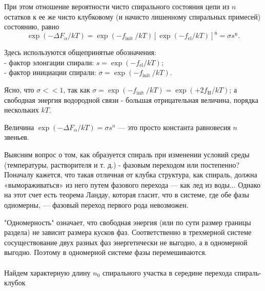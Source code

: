 \documentclass[
11pt,%
tightenlines,%
twoside,%
onecolumn,%
nofloats,%
nobibnotes,%
nofootinbib,%
superscriptaddress,%
noshowpacs,%
centertags]%
{revtex4}
\begin{document}
При этом отношение вероятности чисто спирального состояния цепи из $n$ остатков к ее же чисто клубковому (и начисто лишенному спиральных примесей) состоянию, равно
\begin{equation}
	\exp \left(-\Delta F_\alpha / k T\right)=\exp \left(-f_{\text {init }} / k T\right)\left[\exp \left(-f_{\mathrm{el}} / k T\right)\right]^{\mathrm{n}}=\sigma s^{\mathrm{n}} .
\end{equation}

Здесь используются общепринятые обозначения:
\\- фактор элонгации спирали: $s=\exp \left(-f_{\mathrm{el}} / k T\right)$;
\\- фактор инициации спирали: $\sigma=\exp \left(-f_{\text {init }} / k T\right)$.

Ясно, что $\sigma<<1$, так как $\sigma=\exp \left(-f_{\text {init }} / k T\right)=\exp \left(+2 f_{\mathrm{H}} / k T\right)$; а свободная энергия водородной связи - большая отрицательная величина, порядка нескольких $k T$.

Величина $\exp \left(-\Delta F_\alpha / k T\right)=\sigma s^n$ — это просто константа равновесия $n$ звеньев.

Выясним вопрос о том, как образуется спираль при изменении условий среды (температуры, растворителя и т. д.) - фазовым переходом или постепенно?
Поначалу кажется, что такая отличная от клубка структура, как спираль, должна «вымораживаться» из него путем фазового перехода — как лед из воды...
Однако на этот счет есть теорема Ландау, которая гласит, что в системе, где обе фазы одномерны, — фазовый переход первого рода невозможен.

"Одномерность" означает, что свободная энергия (или по сути размер границы раздела) не зависит размера кусков фаз. Соответственно в трехмерной системе сосуществование двух разных фаз энергетически не выгодно, а в одномерной выгодно. Поэтому в одномерной системе фазы перемешиваются. 
\\ \\Найдем характерную длину $n_0$ спирального участка в середине перехода спираль-клубок
\end{document}
